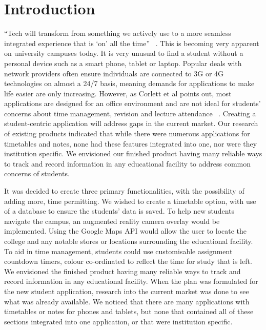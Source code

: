 \chapter{Introduction}
“Tech will transform from something we actively use to a more seamless integrated experience that is ‘on’ all the time” ~\cite{nodes}. This is becoming very apparent on university campuses today. It is very unusual to find a student without a personal device such as a smart phone, tablet or laptop. Popular deals with network providers often ensure individuals are connected to 3G or 4G technologies on almost a 24/7 basis, meaning demands for applications to make life easier are only increasing. However, as Corlett et al points out, most applications are designed for an office environment and are not ideal for students’ concerns about time management, revision and lecture attendance ~\cite{corlett}. Creating a student-centric application will address gaps in the current market. Our research of existing products indicated that while there were numerous applications for timetables and notes, none had these features integrated into one, nor were they institution specific. We envisioned our finished product having many reliable ways to track and record information in any educational facility to address common concerns of students.

It was decided to create three primary functionalities, with the possibility of adding more, time permitting. We wished to create a timetable option, with use of a database to ensure the students' data is saved. To help new students navigate the campus, an augmented reality camera overlay would be implemented. Using the Google Maps API would allow the user to locate the college and any notable stores or locations surrounding the educational facility. To aid in time management, students could use customisable assignment countdown timers, colour co-ordinated to reflect the time for study that is left. 
We envisioned the finished product having many reliable ways to track and record information in any educational facility. When the plan was formulated for the new student application, research into the current market was done to see what was already available. We noticed that there are many applications with timetables or notes for phones and tablets, but none that contained all of these sections integrated into one application, or that were institution specific.
 
